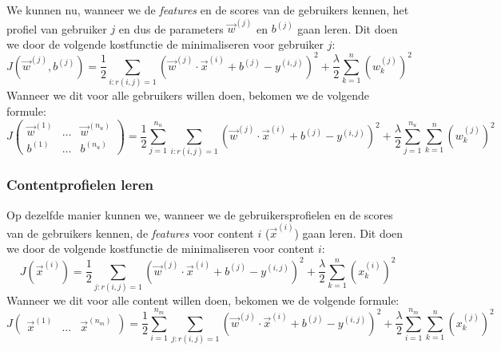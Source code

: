 We kunnen nu, wanneer we de \textit{features} en de scores van de gebruikers kennen, het profiel van gebruiker $j$ en dus de parameters $\vec{w}^{(j)}$ en $b^{(j)}$ gaan leren. Dit doen we door de volgende kostfunctie de minimaliseren voor gebruiker $j$:
\begin{equation}
	J(\vec{w}^{(j)}, b^{(j)}) = \frac{1}{2} \sum_{i:r(i, j) = 1} (\vec{w}^{(j)} \cdot \vec{x}^{(i)} + b^{(j)} - y^{(i, j)})^{2} + \frac{\lambda}{2} \sum_{k=1}^{n}(w_{k}^{(j)})^{2}
\end{equation}
\noindent
Wanneer we dit voor alle gebruikers willen doen, bekomen we de volgende formule:
\begin{equation}
	J \begin{pmatrix} \vec{w}^{(1)} & \ldots & \vec{w}^{(n_{u})}\\ b^{(1)} & \ldots & b^{(n_{u})} \end{pmatrix} 
	= \frac{1}{2} \sum_{j=1}^{n_{u}} \sum_{i:r(i, j) = 1} (\vec{w}^{(j)} \cdot \vec{x}^{(i)} + b^{(j)} - y^{(i, j)})^{2} 
	+ \frac{\lambda}{2} \sum_{j=1}^{n_{u}} \sum_{k=1}^{n}(w_{k}^{(j)})^{2}
	\label{eq:user-cost}
\end{equation}

\subsubsection{Contentprofielen leren}

Op dezelfde manier kunnen we, wanneer we de gebruikersprofielen en de scores van de gebruikers kennen, de \textit{features} voor content $i$ ($\vec{x}^{(i)}$) gaan leren. Dit doen we door de volgende kostfunctie de minimaliseren voor content $i$:
\begin{equation}
	J(\vec{x}^{(i)}) = \frac{1}{2} \sum_{j:r(i, j) = 1} (\vec{w}^{(j)} \cdot \vec{x}^{(i)} + b^{(j)} - y^{(i, j)})^{2} + \frac{\lambda}{2} \sum_{k=1}^{n}(x_{k}^{(i)})^{2}
\end{equation}
\noindent
Wanneer we dit voor alle content willen doen, bekomen we de volgende formule:
\begin{equation}
	J \begin{pmatrix} \vec{x}^{(1)} & \ldots & \vec{x}^{(n_{m})}\end{pmatrix} 
	= \frac{1}{2} \sum_{i=1}^{n_{m}} \sum_{j:r(i, j) = 1} (\vec{w}^{(j)} \cdot \vec{x}^{(i)} + b^{(j)} - y^{(i, j)})^{2} 
	+ \frac{\lambda}{2} \sum_{i=1}^{n_{m}} \sum_{k=1}^{n}(x_{k}^{(j)})^{2}
	\label{eq:content-cost}
\end{equation}

